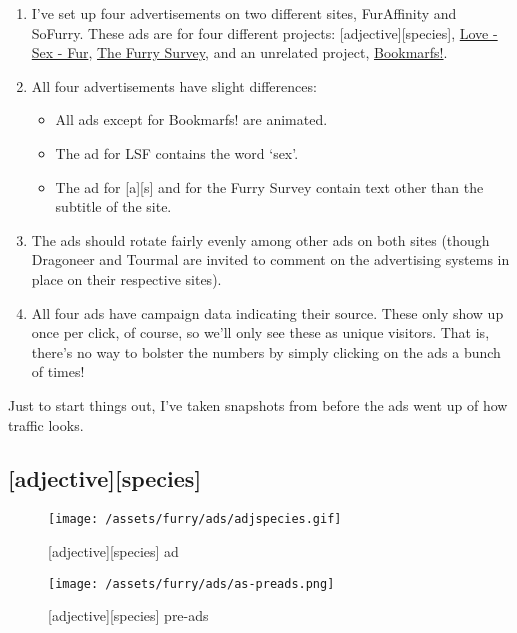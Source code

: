 \begin{enumerate}
\def\labelenumi{\arabic{enumi}.}
\tightlist
\item
  I've set up four advertisements on two different sites, FurAffinity
  and SoFurry. These ads are for four different projects:
  {[}adjective{]}{[}species{]}, \href{http://lovesexfur.com}{Love - Sex
  - Fur}, \href{http://furrypoll.com}{The Furry Survey}, and an
  unrelated project, \href{http://bookmarfs.com}{Bookmarfs!}.
\item
  All four advertisements have slight differences:

  \begin{itemize}
  \tightlist
  \item
    All ads except for Bookmarfs! are animated.
  \item
    The ad for LSF contains the word `sex'.
  \item
    The ad for {[}a{]}{[}s{]} and for the Furry Survey contain text
    other than the subtitle of the site.\\
  \end{itemize}
\item
  The ads should rotate fairly evenly among other ads on both sites
  (though Dragoneer and Tourmal are invited to comment on the
  advertising systems in place on their respective sites).
\item
  All four ads have campaign data indicating their source. These only
  show up once per click, of course, so we'll only see these as unique
  visitors. That is, there's no way to bolster the numbers by simply
  clicking on the ads a bunch of times!
\end{enumerate}

Just to start things out, I've taken snapshots from before the ads went
up of how traffic looks.

\subsection{{[}adjective{]}{[}species{]}}\label{adjectivespecies}

\begin{figure}[htbp]
\centering
\texttt{[image: /assets/furry/ads/adjspecies.gif]}
\caption{{[}adjective{]}{[}species{]} ad}
\end{figure}

\begin{figure}[htbp]
\centering
\texttt{[image: /assets/furry/ads/as-preads.png]}
\caption{{[}adjective{]}{[}species{]} pre-ads}
\end{figure}

